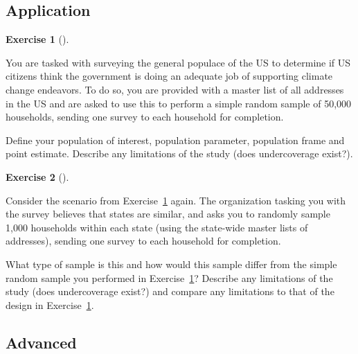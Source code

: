 \documentclass[
  letterpaper,
  DIV=11,
  numbers=noendperiod]{scrreprt}
\theoremstyle{definition}
\newtheorem{exercise}{Exercise}[chapter]
\theoremstyle{remark}
\begin{document}
\hypertarget{sec-ex08-application}{%
\subsection{Application}\label{sec-ex08-application}}

\begin{exercise}[]\protect\hypertarget{exr-ch08-app1}{}\label{exr-ch08-app1}

You are tasked with surveying the general populace of the US to
determine if US citizens think the government is doing an adequate job
of supporting climate change endeavors. To do so, you are provided with
a master list of all addresses in the US and are asked to use this to
perform a simple random sample of 50,000 households, sending one survey
to each household for completion.

Define your population of interest, population parameter, population
frame and point estimate. Describe any limitations of the study (does
undercoverage exist?).

\end{exercise}

\begin{exercise}[]\protect\hypertarget{exr-ch08-app2}{}\label{exr-ch08-app2}

Consider the scenario from Exercise~\ref{exr-ch08-app1} again. The
organization tasking you with the survey believes that states are
similar, and asks you to randomly sample 1,000 households within each
state (using the state-wide master lists of addresses), sending one
survey to each household for completion.

What type of sample is this and how would this sample differ from the
simple random sample you performed in Exercise~\ref{exr-ch08-app1}?
Describe any limitations of the study (does undercoverage exist?) and
compare any limitations to that of the design in
Exercise~\ref{exr-ch08-app1}.

\end{exercise}

\hypertarget{sec-ex08-advanced}{%
\subsection{Advanced}\label{sec-ex08-advanced}}
\end{document}
